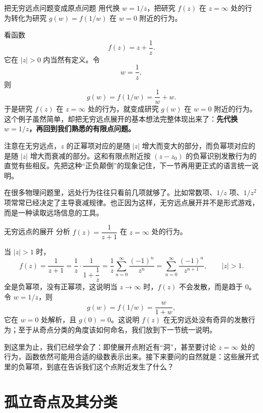 \begin{lizi}{把无穷远点问题变成原点问题}{}
用代换 $w=1/z$，把研究 $f(z)$ 在 $z=\infty$ 处的行为转化为研究 $g(w)=f(1/w)$ 在 $w=0$ 附近的行为。

\begin{jie}
看函数
\[
    f(z)=z+\frac{1}{z}.
\]
它在 $|z|>0$ 内当然有定义。令
\[
    w=\frac{1}{z},
\]
则
\[
    g(w)=f(1/w)=\frac{1}{w}+w.
\]
于是研究 $f(z)$ 在 $z=\infty$ 处的行为，就变成研究 $g(w)$ 在 $w=0$ 附近的行为。这个例子虽然简单，却把无穷远点展开的基本想法完整体现出来了：\textbf{先代换 $w=1/z$，再回到我们熟悉的有限点问题。}
\end{jie}
\end{lizi}

\begin{tishi}[``正''``负''的颠倒]
注意在无穷远点，$z$ 的正幂项对应的是随 $|z|$ 增大而变大的部分，而负幂项对应的是随 $|z|$ 增大而衰减的部分。这和有限点附近按 $(z-z_0)$ 的负幂识别发散行为的直觉有些相反。先把这种``正负颠倒''的现象记住，下一节再用更正式的语言统一说明。
\end{tishi}

\begin{zhu}{}{}
在很多物理问题里，远处行为往往只看前几项就够了。比如常数项、$1/z$ 项、$1/z^2$ 项常常已经决定了主导衰减规律。也正因为这样，无穷远点展开并不是形式游戏，而是一种读取远场信息的工具。
\end{zhu}

\begin{lizi}{无穷远点的展开}{}
分析 $f(z)=\dfrac{1}{z+1}$ 在 $z=\infty$ 处的行为。

\begin{jie}
当 $|z|>1$ 时，
\[
    f(z)=\frac{1}{z+1}=\frac{1}{z}\cdot\frac{1}{1+\dfrac{1}{z}}
    = \frac{1}{z}\sum_{n=0}^{\infty}\frac{(-1)^n}{z^n}
    = \sum_{n=0}^{\infty}\frac{(-1)^n}{z^{n+1}},\qquad |z|>1.
\]
全是负幂项，没有正幂项，这说明当 $z\to\infty$ 时，$f(z)$ 不会发散，而是趋于 $0$。令 $w=1/z$，则
\[
    g(w)=f(1/w)=\frac{w}{1+w},
\]
它在 $w=0$ 处解析，且 $g(0)=0$。这说明 $f(z)$ 在无穷远处没有奇异的发散行为；至于从奇点分类的角度该如何命名，我们放到下一节统一说明。
\end{jie}
\end{lizi}

到这里为止，我们已经学会了：即使展开点附近有``洞''，甚至要讨论 $z=\infty$ 处的行为，函数依然可能用合适的级数表示出来。接下来要问的自然就是：这些展开式里的负幂项，到底在告诉我们这个点附近发生了什么？

\section{孤立奇点及其分类}


